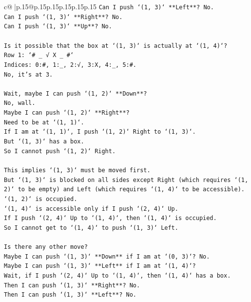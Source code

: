 \documentclass{article}
\begin{document}
{\begin{supertabular}{c@{$\;$}|p{.15\linewidth}@{}p{.15\linewidth}p{.15\linewidth}p{.15\linewidth}p{.15\linewidth}p{.15\linewidth}}
{{{\texttt{Can I push `(1, 3)` **Left**? No.} \\
\texttt{Can I push `(1, 3)` **Right**? No.} \\
\texttt{Can I push `(1, 3)` **Up**? No.} \\
\\ 
\texttt{Is it possible that the box at `(1, 3)` is actually at `(1, 4)`?} \\
\texttt{Row 1: `\# \_ √ X \_ \#`} \\
\texttt{Indices: 0:\#, 1:\_, 2:√, 3:X, 4:\_, 5:\#.} \\
\texttt{No, it's at 3.} \\
\\ 
\texttt{Wait, maybe I can push `(1, 2)` **Down**?} \\
\texttt{No, wall.} \\
\texttt{Maybe I can push `(1, 2)` **Right**?} \\
\texttt{Need to be at `(1, 1)`.} \\
\texttt{If I am at `(1, 1)`, I push `(1, 2)` Right to `(1, 3)`.} \\
\texttt{But `(1, 3)` has a box.} \\
\texttt{So I cannot push `(1, 2)` Right.} \\
\\ 
\texttt{This implies `(1, 3)` must be moved first.} \\
\texttt{But `(1, 3)` is blocked on all sides except Right (which requires `(1, 2)` to be empty) and Left (which requires `(1, 4)` to be accessible).} \\
\texttt{`(1, 2)` is occupied.} \\
\texttt{`(1, 4)` is accessible only if I push `(2, 4)` Up.} \\
\texttt{If I push `(2, 4)` Up to `(1, 4)`, then `(1, 4)` is occupied.} \\
\texttt{So I cannot get to `(1, 4)` to push `(1, 3)` Left.} \\
\\ 
\texttt{Is there any other move?} \\
\texttt{Maybe I can push `(1, 3)` **Down** if I am at `(0, 3)`? No.} \\
\texttt{Maybe I can push `(1, 3)` **Left** if I am at `(1, 4)`?} \\
\texttt{Wait, if I push `(2, 4)` Up to `(1, 4)`, then `(1, 4)` has a box.} \\
\texttt{Then I can push `(1, 3)` **Right**? No.} \\
\texttt{Then I can push `(1, 3)` **Left**? No.} \\
}}}
\end{supertabular}}
\end{document}
